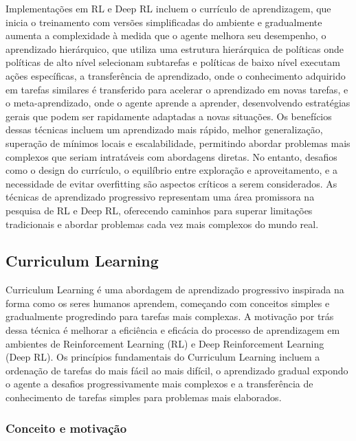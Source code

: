 Implementações em RL e Deep RL incluem o currículo de aprendizagem, que inicia o treinamento com versões simplificadas do ambiente e gradualmente aumenta a complexidade à medida que o agente melhora seu desempenho, o aprendizado hierárquico, que utiliza uma estrutura hierárquica de políticas onde políticas de alto nível selecionam subtarefas e políticas de baixo nível executam ações específicas, a transferência de aprendizado, onde o conhecimento adquirido em tarefas similares é transferido para acelerar o aprendizado em novas tarefas, e o meta-aprendizado, onde o agente aprende a aprender, desenvolvendo estratégias gerais que podem ser rapidamente adaptadas a novas situações. Os benefícios dessas técnicas incluem um aprendizado mais rápido, melhor generalização, superação de mínimos locais e escalabilidade, permitindo abordar problemas mais complexos que seriam intratáveis com abordagens diretas. No entanto, desafios como o design do currículo, o equilíbrio entre exploração e aproveitamento, e a necessidade de evitar overfitting são aspectos críticos a serem considerados. As técnicas de aprendizado progressivo representam uma área promissora na pesquisa de RL e Deep RL, oferecendo caminhos para superar limitações tradicionais e abordar problemas cada vez mais complexos do mundo real\cite{DeSouzaRibeiro2024AuxlioAD,Brito2023AplicaesDA,Felippe2024OUD,Rocha2024SonsPE,Dias2023AplicaoDA,Geremias2024OUD}.

\subsection{Curriculum Learning}
\label{subsec:curriculum}

Curriculum Learning é uma abordagem de aprendizado progressivo inspirada na forma como os seres humanos aprendem, começando com conceitos simples e gradualmente progredindo para tarefas mais complexas. A motivação por trás dessa técnica é melhorar a eficiência e eficácia do processo de aprendizagem em ambientes de Reinforcement Learning (RL) e Deep Reinforcement Learning (Deep RL). Os princípios fundamentais do Curriculum Learning incluem a ordenação de tarefas do mais fácil ao mais difícil, o aprendizado gradual expondo o agente a desafios progressivamente mais complexos e a transferência de conhecimento de tarefas simples para problemas mais elaborados.

\subsubsection{Conceito e motivação}
\label{subsubsec:curriculum_conceito}

